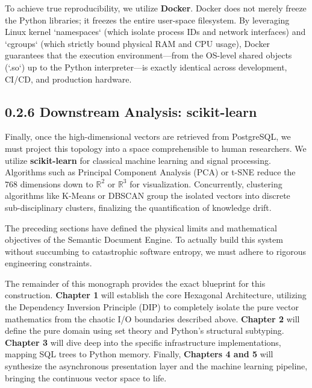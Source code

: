 To achieve true reproducibility, we utilize \textbf{Docker}. Docker does not merely freeze the Python libraries; it freezes the entire user-space filesystem. By leveraging Linux kernel `namespaces` (which isolate process IDs and network interfaces) and `cgroups` (which strictly bound physical RAM and CPU usage), Docker guarantees that the execution environment—from the OS-level shared objects (`.so`) up to the Python interpreter—is exactly identical across development, CI/CD, and production hardware.










\subsection*{0.2.6 Downstream Analysis: scikit-learn}

Finally, once the high-dimensional vectors are retrieved from PostgreSQL, we must project this topology into a space comprehensible to human researchers. We utilize \textbf{scikit-learn} for classical machine learning and signal processing. Algorithms such as Principal Component Analysis (PCA) or t-SNE reduce the $768$ dimensions down to $\mathbb{R}^2$ or $\mathbb{R}^3$ for visualization. Concurrently, clustering algorithms like K-Means or DBSCAN group the isolated vectors into discrete sub-disciplinary clusters, finalizing the quantification of knowledge drift.

The preceding sections have defined the physical limits and mathematical objectives of the Semantic Document Engine. To actually build this system without succumbing to catastrophic software entropy, we must adhere to rigorous engineering constraints.

The remainder of this monograph provides the exact blueprint for this construction. \textbf{Chapter 1} will establish the core Hexagonal Architecture, utilizing the Dependency Inversion Principle (DIP) to completely isolate the pure vector mathematics from the chaotic I/O boundaries described above. \textbf{Chapter 2} will define the pure domain using set theory and Python's structural subtyping. \textbf{Chapter 3} will dive deep into the specific infrastructure implementations, mapping SQL trees to Python memory. Finally, \textbf{Chapters 4 and 5} will synthesize the asynchronous presentation layer and the machine learning pipeline, bringing the continuous vector space to life.
